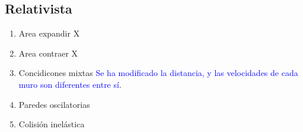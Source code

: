 \documentclass[11pt, spanish]{book}
\begin{document}
\subsection{Relativista}
\begin{enumerate}
    \item Area expandir X
    \item Area contraer X
    \item Concidicones mixtas \textcolor{blue}{Se ha modificado la distancia, y las velocidades de cada muro son diferentes entre sí}.
    \item Paredes oscilatorias
    \item Colisión inelástica
\end{enumerate}
\end{document}
